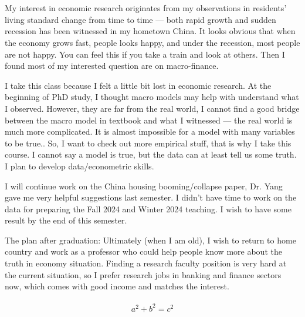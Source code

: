 \documentclass[12pt,letterpaper]{article}
\begin{document}
	\begin{center}
	\medskip\\
	\end{center}
\smallskip\\
My interest in economic research originates from my observations in residents' living standard change from time to time --- both rapid growth and sudden recession has been witnessed in my hometown China. It looks obvious that when the economy grows fast, people looks happy, and under the recession, most people are not happy. You can feel this if you take a train and look at others. Then I found most of my interested question are on macro-finance.

I take this class because I felt a little bit lost in economic research. At the beginning of PhD study, I thought macro models may help with understand what I observed. However, they are far from the real world, I cannot find a good bridge between the macro model in textbook and what I witnessed --- the real world is much more complicated. It is almost impossible for a model with many variables to be true.. So, I want to check out more empirical stuff, that is why I take this course. I cannot say a model is true, but the data can at least tell us some truth. I plan to develop data/econometric skills.

I will continue work on the China housing booming/collapse paper, Dr. Yang gave me very helpful suggestions last semester. I didn't have time to work on the data for preparing the Fall 2024 and Winter 2024 teaching. I wish to have some result by the end of this semester.

The plan after graduation: Ultimately (when I am old), I wish to return to home country and work as a professor who could help people know more about the truth in economy situation. Finding a research faculty position is very hard at the current situation, so I prefer research jobs in banking and finance sectors now, which comes with good income and matches the interest.\medskip\\
\smallskip\\

$$a^2+b^2=c^2$$
\end{document}
